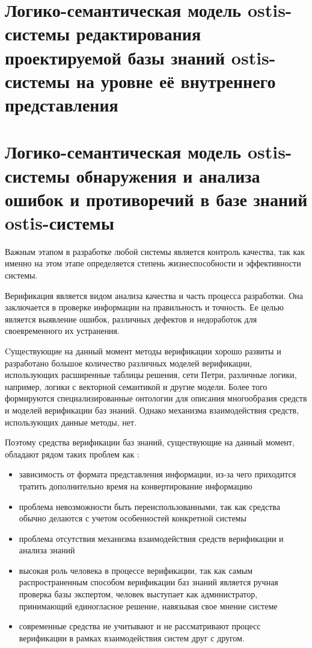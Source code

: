 \section{Логико-семантическая модель ostis-системы редактирования проектируемой базы знаний ostis-системы на уровне её внутреннего представления}
\section{Логико-семантическая модель ostis-системы обнаружения и анализа ошибок и противоречий в базе знаний ostis-системы}

Важным этапом в разработке любой системы является контроль качества, так как именно на этом этапе определяется степень жизнеспособности и эффективности системы.

Верификация является видом анализа качества и часть процесса разработки. Она заключается в проверке информации на правильность и точность.
Ее целью является выявление ошибок, различных дефектов и недоработок для своевременного их устранения.

Cуществующие на данный момент методы верификации хорошо развиты и разработано большое количество различных моделей верификации, использующих расширенные таблицы решения, сети Петри\cite{Petri}, различные логики, например, логики с векторной семантикой\cite{VTF1}\cite{VTF2} и другие модели. Более того формируются специализированные онтологии для описания многообразия средств и моделей верификации баз знаний\cite{RybinaAlgo}. Однако механизма взаимодействия средств, использующих данные методы, нет.

Поэтому средства верификации баз знаний, существующие на данный момент, обладают рядом таких проблем как \cite{ZhangProblems}:
\begin{itemize}
    \item зависимость от формата представления информации, из-за чего приходится тратить дополнительно время на конвертирование информацию
    \item проблема невозможности быть переиспользованными, так как средства обычно делаются с учетом особенностей конкретной системы
    \item проблема отсутствия механизма взаимодействия средств верификации и анализа знаний
    \item высокая роль человека в процессе верификации, так как самым распространенным способом верификации баз знаний является ручная проверка базы экспертом, человек выступает как администратор, принимающий единогласное решение, навязывая свое мнение системе
    \item современные средства не учитывают и не рассматривают процесс верификации в рамках взаимодействия систем друг с другом.
\end{itemize}

